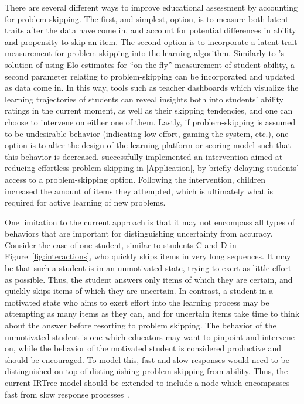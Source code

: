 \documentclass[anonymous,manuscript,review]{acmart}
\begin{document}
There are several different ways to improve educational assessment by accounting for problem-skipping. The first, and simplest, option, is to measure both latent traits after the data have come in, and account for potential differences in ability and propensity to skip an item. The second option is to incorporate a latent trait measurement for problem-skipping into the learning algorithm. Similarly to \citet{klinkenberg2011computer}'s solution of using Elo-estimates for ``on the fly'' measurement of student ability, a second parameter relating to problem-skipping can be incorporated and updated as data come in. In this way, tools such as teacher dashboards which visualize the learning trajectories of students can reveal insights both into students' ability ratings in the current moment, as well as their skipping tendencies, and one can choose to intervene on either one of them. Lastly, if problem-skipping is assumed to be undesirable behavior (indicating low effort, gaming the system, etc.), one option is to alter the design of the learning platform or scoring model such that this behavior is decreased. \citet{savi2018delaying} successfully implemented an intervention aimed at reducing effortless problem-skipping in [Application], by briefly delaying students' access to a problem-skipping option. Following the intervention, children increased the amount of items they attempted, which is ultimately what is required for active learning of new problems. 

One limitation to the current approach is that it may not encompass all types of behaviors that are important for distinguishing uncertainty from accuracy. Consider the case of one student, similar to students C and D in Figure~\ref{fig:interactions}, who quickly skips items in very long sequences. It may be that such a student is in an unmotivated state, trying to exert as little effort as possible. Thus, the student answers only items of which they are certain, and quickly skips items of which they are uncertain. In contrast, a student in a motivated state who aims to exert effort into the learning process may be attempting as many items as they can, and for uncertain items take time to think about the answer before resorting to problem skipping. The behavior of the unmotivated student is one which educators may want to pinpoint and intervene on, while the behavior of the motivated student is considered productive and should be encouraged. To model this, fast and slow responses would need to be distinguished on top of distinguishing problem-skipping from ability. Thus, the current IRTree model should be extended to include a node which encompasses fast from slow response processes~\cite{coomans2016distinguishing}. 
\end{document}
